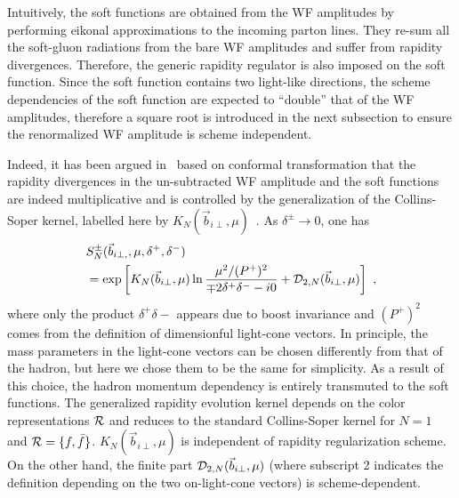 \documentclass[twocolumn,superscriptaddress,longbibliography,10pt]{revtex4-1}
\begin{document}
Intuitively, the soft functions are obtained from the WF amplitudes by performing eikonal approximations to the incoming parton lines. They re-sum all the soft-gluon radiations from the bare WF amplitudes and suffer from rapidity divergences. Therefore, the generic rapidity regulator is also imposed on the soft function.  Since the soft function contains two light-like directions, the scheme dependencies of the soft function are expected to ``double'' that of the WF amplitudes, therefore a square root is introduced in the next subsection to ensure the renormalized WF amplitude is scheme independent.

Indeed, it has been argued in~\cite{Vladimirov:2017ksc} based on conformal transformation that the rapidity divergences in the un-subtracted WF amplitude and the soft functions are indeed multiplicative and is controlled by the generalization of the {\rm Collins-Soper kernel}, labelled here by  $K_N(\vec{b}_{i\perp},\mu)$~\cite{Collins:1981uk}. As $\delta^{\pm} \rightarrow 0$, one has
\begin{align}\label{eq:SNon}
    &S^{\pm}_{N}(\vec{b}_{i\perp,},\mu,\delta^+,\delta^-)\nonumber \\
    &=\exp \left[K_N(\vec{b}_{i\perp},\mu)\ln \frac{\mu^2/(P^+)^2}{\mp 2\delta^+\delta^--i0}+{\cal D}_{2,N}(\vec{b}_{i\perp},\mu)\right] \ ,
\end{align}
where only the product $\delta^+\delta-$ appears due to boost invariance and $(P^+)^2$ comes from the definition of dimensionful light-cone vectors. In principle, the mass parameters in the light-cone vectors can be chosen differently from that of the hadron, but here we chose them to be the same for simplicity. As a result of this choice, the hadron momentum dependency is entirely transmuted  to the soft functions. The generalized rapidity evolution kernel depends on the color representations ${\cal R}$ and reduces to the standard Collins-Soper kernel for $N=1$ and ${\cal R}=\{f,\bar f \}$. $K_N(\vec{b}_{i\perp},\mu)$ is independent of rapidity regularization scheme. On the other hand, the finite part ${\cal D}_{2,N}(\vec{b}_{i\perp},\mu)$ (where subscript 2 indicates the definition depending on the two on-light-cone vectors) is scheme-dependent.
\end{document}
